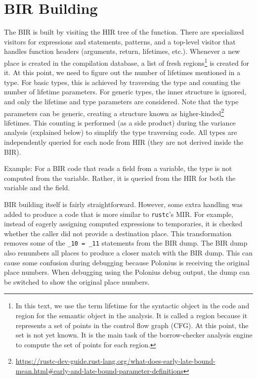 \documentclass[
  11pt,
]{report}
\renewenvironment{quote}{\begin{myquote}}{\end{myquote}}
\DeclareRobustCommand{\href}[2]{#2\footnote{\url{#1}}}
\begin{document}
\section{BIR Building}\label{bir-building}

The BIR is built by visiting the HIR tree of the function. There are
specialized visitors for expressions and statements, patterns, and a
top-level visitor that handles function headers (arguments, return,
lifetimes, etc.). Whenever a new place is created in the compilation
database, a list of fresh regions\footnote{In this text, we use the term
  lifetime for the syntactic object in the code and region for the
  semantic object in the analysis. It is called a region because it
  represents a set of points in the control flow graph (CFG). At this
  point, the set is not yet known. It is the main task of the
  borrow-checker analysis engine to compute the set of points for each
  region.} is created for it. At this point, we need to figure out the
number of lifetimes mentioned in a type. For basic types, this is
achieved by traversing the type and counting the number of lifetime
parameters. For generic types, the inner structure is ignored, and only
the lifetime and type parameters are considered. Note that the type
parameters can be generic, creating a structure known as
\href{https://rustc-dev-guide.rust-lang.org/what-does-early-late-bound-mean.html\#early-and-late-bound-parameter-definitions}{higher-kinded}
lifetimes. This counting is performed (as a side product) during the
variance analysis (explained below) to simplify the type traversing
code. All types are independently queried for each node from HIR (they
are not derived inside the BIR).

\begin{quote}
Example: For a BIR code that reads a field from a variable, the type is
not computed from the variable. Rather, it is queried from the HIR for
both the variable and the field.
\end{quote}

BIR building itself is fairly straightforward. However, some extra
handling was added to produce a code that is more similar to
\texttt{rustc}'s MIR. For example, instead of eagerly assigning computed
expressions to temporaries, it is checked whether the caller did not
provide a destination place. This transformation removes some of the
\texttt{\_10\ =\ \_11} statements from the BIR dump. The BIR dump also
renumbers all places to produce a closer match with the BIR dump. This
can cause some confusion during debugging because Polonius is receiving
the original place numbers. When debugging using the Polonius debug
output, the dump can be switched to show the original place numbers.
\end{document}

